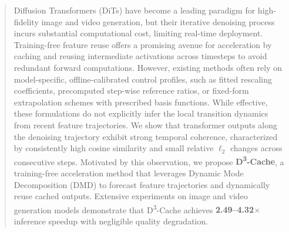 \begin{abstract}

Diffusion Transformers (DiTs) have become a leading paradigm
for high-fidelity image and video generation,
but their iterative denoising process incurs substantial computational cost,
limiting real-time deployment.
Training-free feature reuse offers a promising avenue for acceleration
by caching and reusing intermediate activations across timesteps
to avoid redundant forward computations.
However, existing methods often rely on model-specific,
offline-calibrated control profiles,
such as fitted rescaling coefficients,
precomputed step-wise reference ratios,
or fixed-form extrapolation schemes with prescribed basis functions.
While effective,
these formulations do not explicitly infer the local transition dynamics
from recent feature trajectories.
We show that transformer outputs along the denoising trajectory
exhibit strong temporal coherence,
characterized by consistently high cosine similarity
and small relative \(\ell_2\) changes across consecutive steps.
Motivated by this observation, we propose \textbf{D\textsuperscript{3}-Cache},
a training-free acceleration method
that leverages Dynamic Mode Decomposition (DMD)
to forecast feature trajectories
and dynamically reuse cached outputs.
Extensive experiments on image and video generation models demonstrate that
D\textsuperscript{3}-Cache achieves
\textbf{2.49--4.32$\times$} inference speedup
with negligible quality degradation.
\end{abstract}
